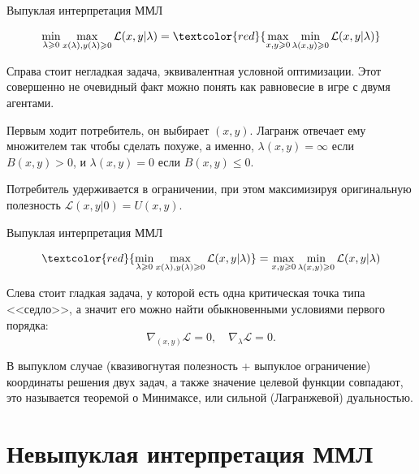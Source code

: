 \documentclass{beamer}
\begin{document}
\begin{frame}{Выпуклая интерпретация ММЛ}

$$ \min_{\lambda \geqslant 0} \max_{x(\lambda),y(\lambda) \geqslant 0} \mathcal{L}(x,y | \lambda) = \textcolor{red}{\max_{x,y \geqslant 0} \min_{\lambda(x,y) \geqslant 0} \mathcal{L}(x,y | \lambda)} $$ 

Справа стоит негладкая задача, эквивалентная условной оптимизации. Этот совершенно не очевидный факт можно понять как равновесие в игре с двумя агентами.

Первым ходит потребитель, он выбирает $(x,y)$. Лагранж отвечает ему множителем так чтобы сделать похуже, а именно, $\lambda(x,y) = \infty$ если $B(x,y) > 0$, и $\lambda(x,y) = 0$ если $B(x,y) \leqslant 0$. 

Потребитель удерживается в ограничении, при этом максимизируя оригинальную полезность $\mathcal{L}(x,y | 0) = U(x,y)$.

\end{frame}

\begin{frame}{Выпуклая интерпретация ММЛ}

$$ \textcolor{red}{\min_{\lambda \geqslant 0} \max_{x(\lambda),y(\lambda) \geqslant 0} \mathcal{L}(x,y | \lambda)} =  \max_{x,y \geqslant 0} \min_{\lambda(x,y) \geqslant 0} \mathcal{L}(x,y | \lambda) $$ 

Слева стоит гладкая задача, у которой есть одна критическая точка типа <<седло>>, а значит его можно найти обыкновенными условиями первого порядка:
$$ \nabla_{(x,y)} \mathcal{L} = 0, \quad \nabla_{\lambda} \mathcal{L} = 0.$$

В выпуклом случае (квазивогнутая полезность + выпуклое ограничение) координаты решения двух задач, а также значение целевой функции совпадают, это называется \alert{теоремой о Минимаксе}, или сильной (Лагранжевой) дуальностью.

\end{frame}

\section{Невыпуклая интерпретация ММЛ}
\end{document}
